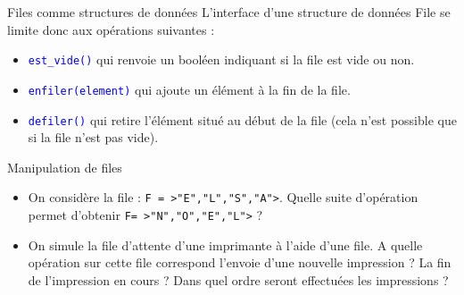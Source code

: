 \documentclass[10pt]{beamer}
\begin{document}
\begin{frame}{\SL}
	\mframe{\SL}
	\begin{alertblock}{Files comme structures de données}
		L'interface d'une structure de données File se limite donc aux opérations suivantes :
		\begin{itemize}
			\item<2-> \textcolor{blue}{\tt est\_vide()} qui renvoie un booléen indiquant si la file est vide ou non.
			\item<3-> \textcolor{blue}{\tt enfiler(element)} qui ajoute un élément à la fin de la file.
			\item<4-> \textcolor{blue}{\tt defiler()} qui retire l'élément situé au début de la file (cela n'est possible que si la file n'est pas vide).
		\end{itemize}
	\end{alertblock}
\end{frame}

\begin{frame}{\SL}
	\mframe{\SL}
	\begin{exampleblock}{Manipulation de files}
		\begin{itemize}
			\item<2-> On considère la file : {\tt F = >"E","L","S","A">}. Quelle suite d'opération permet d'obtenir {\tt F= >"N","O","E","L">} ?
			\item<3-> On simule la file d'attente d'une imprimante à l'aide d'une file. A quelle opération sur cette file correspond l'envoie d'une nouvelle impression ? La fin de l'impression en cours ? Dans quel ordre seront effectuées les impressions ?
		\end{itemize}
	\end{exampleblock}
\end{frame}
\end{document}
